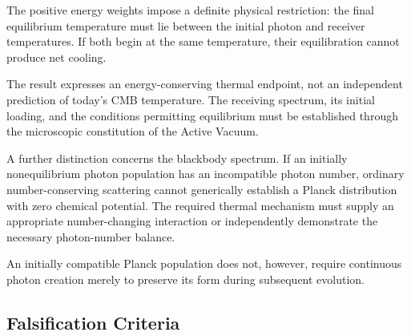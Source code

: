 The positive energy weights impose a definite physical
restriction: the final equilibrium temperature must
lie between the initial photon and receiver temperatures.
If both begin at the same temperature, their equilibration
cannot produce net cooling.

The result expresses an energy-conserving thermal endpoint,
not an independent prediction of today's CMB temperature.
The receiving spectrum, its initial loading, and the
conditions permitting equilibrium must be established
through the microscopic constitution of the Active Vacuum.

A further distinction concerns the blackbody spectrum.
If an initially nonequilibrium photon population has an
incompatible photon number, ordinary number-conserving
scattering cannot generically establish a Planck
distribution with zero chemical potential. The required
thermal mechanism must supply an appropriate
number-changing interaction or independently demonstrate
the necessary photon-number balance.

An initially compatible Planck population does not,
however, require continuous photon creation merely
to preserve its form during subsequent evolution.

\subsection*{Falsification Criteria}

